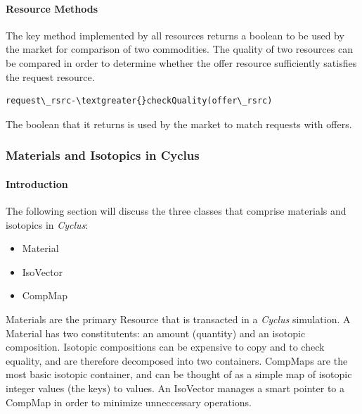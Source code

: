 \documentclass[letterpaper,10pt,english]{sphinxmanual}
\begin{document}
\paragraph{Resource Methods}
\label{devdoc/resources:resource-methods}
The key method implemented by all resources returns a boolean to be used by the
market for comparison of two commodities. The quality of two resources can be
compared in order to determine whether the offer resource sufficiently satisfies the
request resource.

\begin{Verbatim}[commandchars=\\\{\}]
request\_rsrc-\textgreater{}checkQuality(offer\_rsrc)
\end{Verbatim}

The boolean that it returns is used by the market to match requests with offers.


\subsubsection{Materials and Isotopics in Cyclus}
\label{devdoc/materials_and_isotopes:materials-and-isotopics-in-cyclus}\label{devdoc/materials_and_isotopes::doc}

\paragraph{Introduction}
\label{devdoc/materials_and_isotopes:introduction}
The following section will discuss the three classes that comprise materials and
isotopics in \emph{Cyclus}:
\begin{itemize}
\item {} 
Material

\item {} 
IsoVector

\item {} 
CompMap

\end{itemize}

Materials are the primary Resource that is transacted in a \emph{Cyclus} simulation. A
Material has two constitutents: an amount (quantity) and an isotopic composition.
Isotopic compositions can be expensive to copy and to check equality, and are therefore
decomposed into two containers. CompMaps are the most basic isotopic container, and
can be thought of as a simple map of isotopic integer values (the keys) to values.
An IsoVector manages a smart pointer to a CompMap in order to minimize unneccessary
operations.
\end{document}
